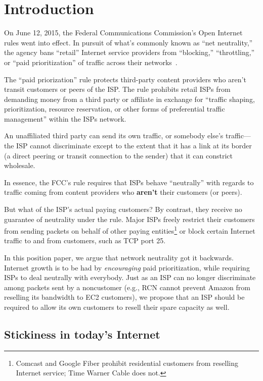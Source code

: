 \section{Introduction}

\label{sec:intro}

On June 12, 2015, the Federal Communications Commission's Open
Internet rules went into effect. In pursuit of what's commonly known
as ``net neutrality,'' the agency bans ``retail'' Internet service
providers from ``blocking,'' ``throttling,'' or ``paid
prioritization'' of traffic across their networks~\cite{openinternet}.

The ``paid priorization'' rule protects third-party
content providers who aren't transit customers or peers of the
ISP. The rule prohibits retail ISPs from demanding money from a third
party or affiliate in exchange for ``traffic shaping, prioritization,
resource reservation, or other forms of preferential traffic
management'' within the ISPs network.

An unaffiliated third party can send its own traffic, or somebody
else's traffic---the ISP cannot discriminate except to the extent that
it has a link at its border (a direct peering or transit connection to
the sender) that it can constrict wholesale.

In essence, the FCC's rule requires that ISPs behave ``neutrally''
with regards to traffic coming from content providers who
\textbf{aren't} their customers (or peers).

But what of the ISP's actual paying customers? By contrast, they
receive no guarantee of neutrality under the rule. Major ISPs freely
restrict their customers from sending packets on behalf of other
paying entities\footnote{Comcast and Google Fiber prohibit residential
  customers from reselling Internet service; Time Warner Cable does
  not.} or block certain Internet traffic to and from
customers, such as TCP port 25.

In this position paper, we argue that network neutrality got it
backwards. Internet growth is to be had by \emph{encouraging} paid
prioritization, while requiring ISPs to deal neutrally with
everybody. Just as an ISP can no longer discriminate among packets
sent by a noncustomer (e.g., RCN cannot prevent Amazon from reselling
its bandwidth to EC2 customers), we propose that an ISP should be
required to allow its own customers to resell their spare capacity as
well.

\subsection{Stickiness in today's Internet}

